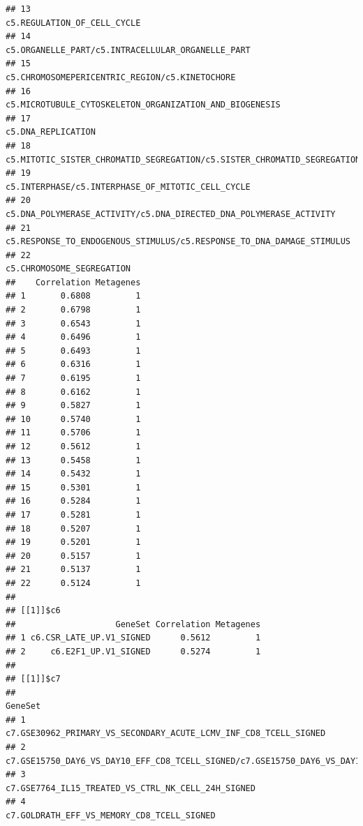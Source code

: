 \documentclass{article}\usepackage[]{graphicx}\usepackage[]{color}
\makeatletter
\newenvironment{kframe}{%
 \def\at@end@of@kframe{}%
 \ifinner\ifhmode%
  \def\at@end@of@kframe{\end{minipage}}%
  \begin{minipage}{\columnwidth}%
 \fi\fi%
 \def\FrameCommand##1{\hskip\@totalleftmargin \hskip-\fboxsep
 \colorbox{shadecolor}{##1}\hskip-\fboxsep
     \hskip-\linewidth \hskip-\@totalleftmargin \hskip\columnwidth}%
 \MakeFramed {\advance\hsize-\width
   \@totalleftmargin\z@ \linewidth\hsize
   \@setminipage}}%
 {\par\unskip\endMakeFramed%
 \at@end@of@kframe}
\newenvironment{knitrout}{}{} %
\makeatother
\begin{document}
\begin{knitrout}
\begin{kframe}
\begin{verbatim}
## 13                                                           c5.REGULATION_OF_CELL_CYCLE
## 14                                     c5.ORGANELLE_PART/c5.INTRACELLULAR_ORGANELLE_PART
## 15                                        c5.CHROMOSOMEPERICENTRIC_REGION/c5.KINETOCHORE
## 16                               c5.MICROTUBULE_CYTOSKELETON_ORGANIZATION_AND_BIOGENESIS
## 17                                                                    c5.DNA_REPLICATION
## 18               c5.MITOTIC_SISTER_CHROMATID_SEGREGATION/c5.SISTER_CHROMATID_SEGREGATION
## 19                                     c5.INTERPHASE/c5.INTERPHASE_OF_MITOTIC_CELL_CYCLE
## 20                    c5.DNA_POLYMERASE_ACTIVITY/c5.DNA_DIRECTED_DNA_POLYMERASE_ACTIVITY
## 21                 c5.RESPONSE_TO_ENDOGENOUS_STIMULUS/c5.RESPONSE_TO_DNA_DAMAGE_STIMULUS
## 22                                                             c5.CHROMOSOME_SEGREGATION
##    Correlation Metagenes
## 1       0.6808         1
## 2       0.6798         1
## 3       0.6543         1
## 4       0.6496         1
## 5       0.6493         1
## 6       0.6316         1
## 7       0.6195         1
## 8       0.6162         1
## 9       0.5827         1
## 10      0.5740         1
## 11      0.5706         1
## 12      0.5612         1
## 13      0.5458         1
## 14      0.5432         1
## 15      0.5301         1
## 16      0.5284         1
## 17      0.5281         1
## 18      0.5207         1
## 19      0.5201         1
## 20      0.5157         1
## 21      0.5137         1
## 22      0.5124         1
## 
## [[1]]$c6
##                    GeneSet Correlation Metagenes
## 1 c6.CSR_LATE_UP.V1_SIGNED      0.5612         1
## 2     c6.E2F1_UP.V1_SIGNED      0.5274         1
## 
## [[1]]$c7
##                                                                                                                                                                               GeneSet
## 1                                                                                                                    c7.GSE30962_PRIMARY_VS_SECONDARY_ACUTE_LCMV_INF_CD8_TCELL_SIGNED
## 2                                                                               c7.GSE15750_DAY6_VS_DAY10_EFF_CD8_TCELL_SIGNED/c7.GSE15750_DAY6_VS_DAY10_TRAF6KO_EFF_CD8_TCELL_SIGNED
## 3                                                                                                                                  c7.GSE7764_IL15_TREATED_VS_CTRL_NK_CELL_24H_SIGNED
## 4                                                                                                                                          c7.GOLDRATH_EFF_VS_MEMORY_CD8_TCELL_SIGNED

\end{verbatim}
\end{kframe}
\end{knitrout}
\end{document}
